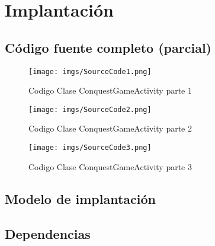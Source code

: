 \section{Implantación}
\subsection{Código fuente completo (parcial)}
\begin{figure}[H]
	\centering
	\texttt{[image: imgs/SourceCode1.png]}
	\caption{Codigo Clase ConquestGameActivity parte 1}
\end{figure}
\begin{figure}[H]
	\centering
	\texttt{[image: imgs/SourceCode2.png]}
	\caption{Codigo Clase ConquestGameActivity parte 2}
\end{figure}
\begin{figure}[H]
	\centering
	\texttt{[image: imgs/SourceCode3.png]}
	\caption{Codigo Clase ConquestGameActivity parte 3}
\end{figure}
\subsection{Modelo de implantación}
\subsection{Dependencias}